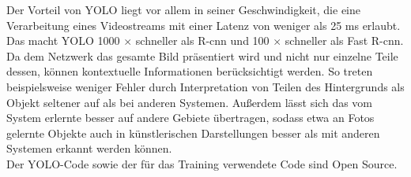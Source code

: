 Der Vorteil von YOLO liegt vor allem in seiner Geschwindigkeit, die eine Verarbeitung eines Videostreams mit einer Latenz von weniger als 25 ms erlaubt.
Das macht YOLO 1000 $\times$ schneller als R-\ac{cnn} und 100 $\times$ schneller als Fast R-\ac{cnn}. Da dem Netzwerk das gesamte Bild präsentiert wird und nicht nur 
einzelne Teile dessen, können kontextuelle Informationen berücksichtigt werden. So treten beispielsweise weniger Fehler durch Interpretation von Teilen des
Hintergrunds als Objekt seltener auf als bei anderen Systemen. Außerdem lässt sich das vom System erlernte besser auf andere Gebiete übertragen, sodass etwa
an Fotos gelernte Objekte auch in künstlerischen Darstellungen besser als mit anderen Systemen erkannt werden können.
 \cite{Redmon.08.06.2015} \cite{Redmon.17.02.2021}\\
 
Der YOLO-Code sowie der für das Training verwendete Code sind Open Source.
